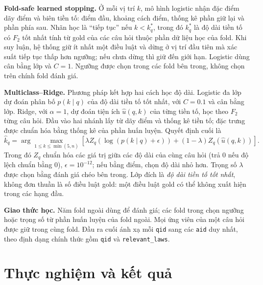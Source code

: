 \documentclass[12pt,a4paper]{article}
\newcommand{\id}[1]{\texttt{#1}}
\begin{document}
\textbf{Fold-safe learned stopping.} Ở mỗi vị trí $k$, mô hình logistic nhận đặc điểm dãy điểm và biên tiền tố: điểm đầu, khoảng cách điểm, thống kê phần giữ lại và phần phía sau. Nhãn học là ``tiếp tục'' nếu $k<k_q^*$, trong đó $k_q^*$ là độ dài tiền tố có $F_2$ tốt nhất tính từ gold của các câu hỏi thuộc phần dữ liệu học của fold. Khi suy luận, hệ thống giữ ít nhất một điều luật và dừng ở vị trí đầu tiên mà xác suất tiếp tục thấp hơn ngưỡng; nếu chưa dừng thì giữ đến giới hạn. Logistic dùng cân bằng lớp và $C=1$. Ngưỡng được chọn trong các fold bên trong, không chọn trên chính fold đánh giá.

\textbf{Multiclass--Ridge.} Phương pháp kết hợp hai cách học độ dài. Logistic đa lớp dự đoán phân bố $p(k\mid q)$ của độ dài tiền tố tốt nhất, với $C=0.1$ và cân bằng lớp. Ridge, với $\alpha=1$, dự đoán tiện ích $\widehat{u}(q,k)$ của từng tiền tố, học theo $F_2$ từng câu hỏi. Đầu vào hai nhánh lấy từ dãy điểm và thống kê tiền tố; đặc trưng được chuẩn hóa bằng thống kê của phần huấn luyện. Quyết định cuối là
\begin{equation}
\widehat{k}_q=\arg\max_{1\le k\le\min(5,n)}\left[
\lambda Z_q\!\left(\log(p(k\mid q)+\epsilon)\right)
+(1-\lambda)Z_q\!\left(\widehat{u}(q,k)\right)\right].\label{eq:ensemble}
\end{equation}
Trong đó $Z_q$ chuẩn hóa các giá trị giữa các độ dài của cùng câu hỏi (trả 0 nếu độ lệch chuẩn bằng 0), $\epsilon=10^{-12}$; nếu bằng điểm, chọn độ dài nhỏ hơn. Trọng số $\lambda$ được chọn bằng đánh giá chéo bên trong. Lớp đích là \emph{độ dài tiền tố tốt nhất}, không đơn thuần là số điều luật gold: một điều luật gold có thể không xuất hiện trong các hạng đầu.

\textbf{Giao thức học.} Năm fold ngoài dùng để đánh giá; các fold trong chọn ngưỡng hoặc trọng số từ phần huấn luyện của fold ngoài. Mọi ứng viên của một câu hỏi được giữ trong cùng fold. Đầu ra cuối ánh xạ mỗi \id{qid} sang các \id{aid} duy nhất, theo định dạng chính thức gồm \id{qid} và \id{relevant\_laws}.
\clearpage
\section{Thực nghiệm và kết quả}\label{sec:experiments}
\end{document}
